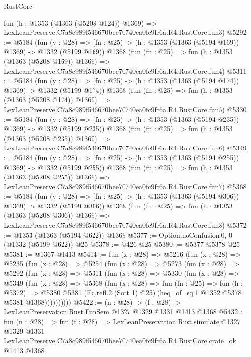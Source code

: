 \begin{lexlean}{RustCore}
\begin{coremodule}
    fun (h : @1353 (@1363 (@5208 @124)) @1369) =>
    LexLeanPreserve.C7a8c989f546670bee70740ea0fc9fc6a.R4.RustCore.fun3)
@5292 := @5184
    (fun (y : @28) => (fn : @25) -> (h : @1353 (@1363 (@5194 @169)) @1369) -> @1332 (@5199 @169))
    @1368
    (fun (fn : @25) =>
    fun (h : @1353 (@1363 (@5208 @169)) @1369) =>
    LexLeanPreserve.C7a8c989f546670bee70740ea0fc9fc6a.R4.RustCore.fun4)
@5311 := @5184
    (fun (y : @28) => (fn : @25) -> (h : @1353 (@1363 (@5194 @174)) @1369) -> @1332 (@5199 @174))
    @1368
    (fun (fn : @25) =>
    fun (h : @1353 (@1363 (@5208 @174)) @1369) =>
    LexLeanPreserve.C7a8c989f546670bee70740ea0fc9fc6a.R4.RustCore.fun5)
@5330 := @5184
    (fun (y : @28) => (fn : @25) -> (h : @1353 (@1363 (@5194 @235)) @1369) -> @1332 (@5199 @235))
    @1368
    (fun (fn : @25) =>
    fun (h : @1353 (@1363 (@5208 @235)) @1369) =>
    LexLeanPreserve.C7a8c989f546670bee70740ea0fc9fc6a.R4.RustCore.fun6)
@5349 := @5184
    (fun (y : @28) => (fn : @25) -> (h : @1353 (@1363 (@5194 @255)) @1369) -> @1332 (@5199 @255))
    @1368
    (fun (fn : @25) =>
    fun (h : @1353 (@1363 (@5208 @255)) @1369) =>
    LexLeanPreserve.C7a8c989f546670bee70740ea0fc9fc6a.R4.RustCore.fun7)
@5368 := @5184
    (fun (y : @28) => (fn : @25) -> (h : @1353 (@1363 (@5194 @306)) @1369) -> @1332 (@5199 @306))
    @1368
    (fun (fn : @25) =>
    fun (h : @1353 (@1363 (@5208 @306)) @1369) =>
    LexLeanPreserve.C7a8c989f546670bee70740ea0fc9fc6a.R4.RustCore.fun8)
@5372 := @1353 (@1363 (@5194 @622)) @1369
@5377 := Option.noConfusion.{0, 0} (@1332 (@5199 @622)) @25
@5378 := @426 @25
@5380 := @5377 @5378 @25
@5381 := @1367 @1413
@5414 := fun (x : @28) =>
  @5216
    (fun (x : @28) =>
    @5235
      (fun (x : @28) =>
      @5254
        (fun (x : @28) =>
        @5273
          (fun (x : @28) =>
          @5292
            (fun (x : @28) =>
            @5311
              (fun (x : @28) =>
              @5330
                (fun (x : @28) =>
                @5349
                  (fun (x : @28) =>
                  @5368
                    (fun (x : @28) =>
                    fun (fn : @25) =>
                    fun (h : @5372) =>
                    @5380
                      @5381
                      (Eq.refl.{2} (Sort 1) @25)
                      (heq_of_eq.{1} @1352 @5378 @5381 @1368))))))))))
@5422 := (n : @28) -> (f : @28) -> LexLeanPreservation.Rust.FunSem @1327 @1329 @1331 @1413 @1368
@5432 := fun (n : @28) =>
  fun (f : @28) =>
  LexLeanPreservation.Rust.simulate
    @1327
    @1329
    @1331
    LexLeanPreserve.C7a8c989f546670bee70740ea0fc9fc6a.R4.RustCore.crate_ok
    @1413
    @1368
\end{coremodule}
\end{lexlean}
